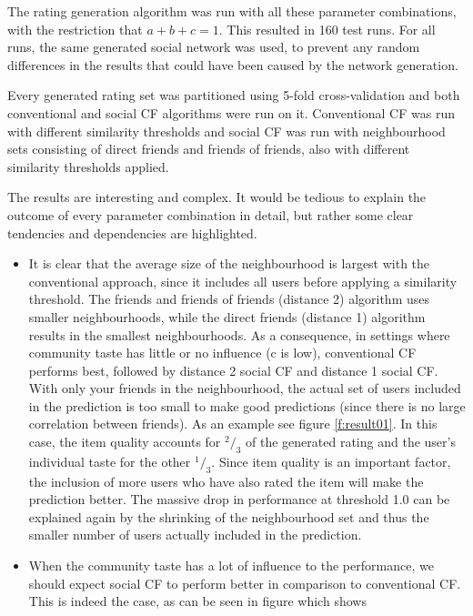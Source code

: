 The rating generation algorithm was run with all these parameter combinations, with the restriction that $a+b+c=1$. This resulted in 160 test runs. For all runs, the same generated social network was used, to prevent any random differences in the results that could have been caused by the network generation.

Every generated rating set was partitioned using 5-fold cross-validation and both conventional and social CF algorithms were run on it. Conventional CF was run with different similarity thresholds and social CF was run with neighbourhood sets consisting of direct friends and friends of friends, also with different similarity thresholds applied.
\newline

The results are interesting and complex. It would be tedious to explain the outcome of every parameter combination in detail, but rather some clear tendencies and dependencies are highlighted.

\begin{itemize}
\item It is clear that the average size of the neighbourhood is largest with the conventional approach, since it includes all users before applying a similarity threshold. The friends and friends of friends (distance 2) algorithm uses smaller neighbourhoods, while the direct friends (distance 1) algorithm results in the smallest neighbourhoods. As a consequence, in settings where community taste has little or no influence (c is low), conventional CF performs best, followed by distance 2 social CF and distance 1 social CF. With only your friends in the neighbourhood, the actual set of users included in the prediction is too small to make good predictions (since there is no large correlation between friends). As an example see figure \ref{f:result01}. In this case, the item quality accounts for $^2 / _3$ of the generated rating and the user's individual taste for the other $^1 / _3$. Since item quality is an important factor, the inclusion of more users who have also rated the item will make the prediction better. The massive drop in performance at threshold 1.0 can be explained again by the shrinking of the neighbourhood set and thus the smaller number of users actually included in the prediction.
\item When the community taste has a lot of influence to the performance, we should expect social CF to perform better in comparison to conventional CF. This is indeed the case, as can be seen in figure %
which shows 
\end{itemize}

